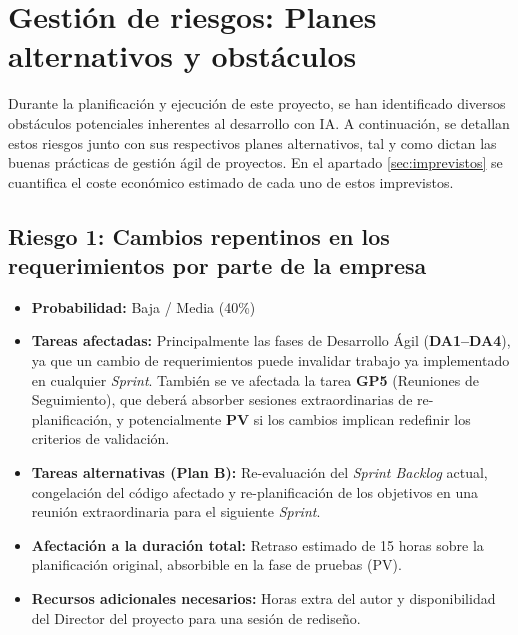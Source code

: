 \documentclass[11pt, letterpaper]{article}
\begin{document}
\section{Gestión de riesgos: Planes alternativos y obstáculos}
\label{sec:gestion_riesgos}
Durante la planificación y ejecución de este proyecto, se han identificado diversos obstáculos potenciales inherentes al desarrollo con IA. A continuación, se detallan estos riesgos junto con sus respectivos planes alternativos, tal y como dictan las buenas prácticas de gestión ágil de proyectos. En el apartado \ref{sec:imprevistos} se cuantifica el coste económico estimado de cada uno de estos imprevistos.

\subsection{Riesgo 1: Cambios repentinos en los requerimientos por parte de la empresa}
\begin{itemize}
    \item \textbf{Probabilidad:} Baja / Media (40\%)
    \item \textbf{Tareas afectadas:} Principalmente las fases de Desarrollo Ágil (\textbf{DA1--DA4}), ya que un cambio de requerimientos puede invalidar trabajo ya implementado en cualquier \textit{Sprint}. También se ve afectada la tarea \textbf{GP5} (Reuniones de Seguimiento), que deberá absorber sesiones extraordinarias de re-planificación, y potencialmente \textbf{PV} si los cambios implican redefinir los criterios de validación.
    \item \textbf{Tareas alternativas (Plan B):} Re-evaluación del \textit{Sprint Backlog} actual, congelación del código afectado y re-planificación de los objetivos en una reunión extraordinaria para el siguiente \textit{Sprint}.
    \item \textbf{Afectación a la duración total:} Retraso estimado de 15 horas sobre la planificación original, absorbible en la fase de pruebas (PV).
    \item \textbf{Recursos adicionales necesarios:} Horas extra del autor y disponibilidad del Director del proyecto para una sesión de rediseño.
\end{itemize}
\end{document}
